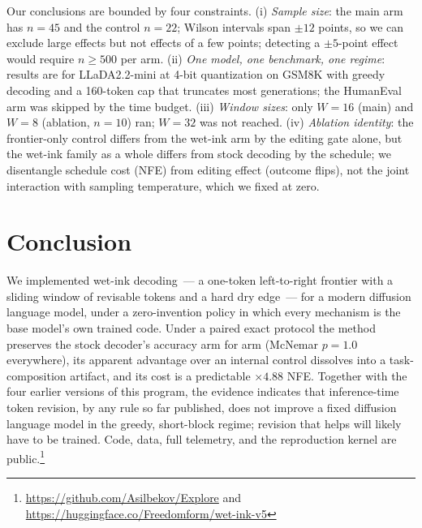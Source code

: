 Our conclusions are bounded by four constraints. (i) \emph{Sample size}: the main
arm has $n{=}45$ and the control $n{=}22$; Wilson intervals span $\pm 12$ points,
so we can exclude large effects but not effects of a few points; detecting a
$\pm 5$-point effect would require $n \geq 500$ per arm. (ii) \emph{One model,
one benchmark, one regime}: results are for LLaDA2.2-mini at 4-bit quantization
on GSM8K with greedy decoding and a 160-token cap that truncates most
generations; the HumanEval arm was skipped by the time budget. (iii)
\emph{Window sizes}: only $W{=}16$ (main) and $W{=}8$ (ablation, $n{=}10$) ran;
$W{=}32$ was not reached. (iv) \emph{Ablation identity}: the frontier-only
control differs from the wet-ink arm by the editing gate alone, but the wet-ink
family as a whole differs from stock decoding by the schedule; we disentangle
schedule cost (NFE) from editing effect (outcome flips), not the joint
interaction with sampling temperature, which we fixed at zero.

\section{Conclusion}\label{sec:conclusion}

We implemented wet-ink decoding~--- a one-token left-to-right frontier with a
sliding window of revisable tokens and a hard dry edge~--- for a modern diffusion
language model, under a zero-invention policy in which every mechanism is the
base model's own trained code. Under a paired exact protocol the method preserves
the stock decoder's accuracy arm for arm (McNemar $p{=}1.0$ everywhere), its
apparent advantage over an internal control dissolves into a task-composition
artifact, and its cost is a predictable $\times 4.88$ NFE. Together with the four
earlier versions of this program, the evidence indicates that inference-time
token revision, by any rule so far published, does not improve a fixed diffusion
language model in the greedy, short-block regime; revision that helps will likely
have to be trained. Code, data, full telemetry, and the reproduction kernel are
public.\footnote{\url{https://github.com/Asilbekov/Explore} and
\url{https://huggingface.co/Freedomform/wet-ink-v5}}
